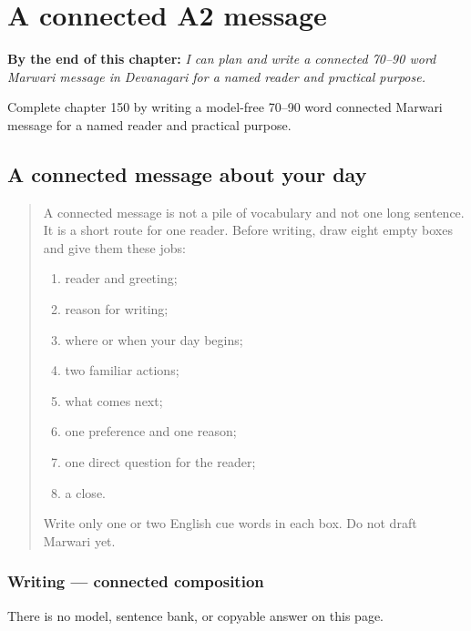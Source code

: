 
\chapter{A connected A2 message}
\label{ch:mw-a-connected-a2-message}

\begin{chapteropening}
\textbf{By the end of this chapter:} \emph{I can plan and write a connected 70–90 word Marwari message in Devanagari for a named reader and practical purpose.}

Complete chapter 150 by writing a model-free 70–90 word connected Marwari message for a named reader and practical purpose.
\end{chapteropening}

\section[(connected A2 writing)]{A connected message about your day}

\label{lesson:MW-W44-a2-connected-composition}



\begin{quote}
A connected message is not a pile of vocabulary and not one long sentence. It is a short route for one reader. Before writing, draw eight empty boxes and give them these jobs:

\begin{enumerate}
\raggedright
  \item reader and greeting;
  \item reason for writing;
  \item where or when your day begins;
  \item two familiar actions;
  \item what comes next;
  \item one preference and one reason;
  \item one direct question for the reader;
  \item a close.
\end{enumerate}

Write only one or two English cue words in each box. Do not draft Marwari yet.
\end{quote}

\subsection*{Writing — connected composition}
There is no model, sentence bank, or copyable answer on this page.

